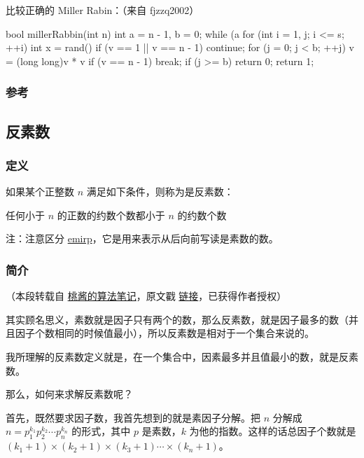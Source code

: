 比较正确的 Miller Rabin：（来自 fjzzq2002）

\begin{cppcode}
bool millerRabbin(int n) {
  int a = n - 1, b = 0;
  while (a %
  for (int i = 1, j; i <= s; ++i) {
    int x = rand() %
    if (v == 1 || v == n - 1) continue;
    for (j = 0; j < b; ++j) {
      v = (long long)v * v %
      if (v == n - 1) break;
    }
    if (j >= b) return 0;
  }
  return 1;
}
\end{cppcode}

\subsubsection{参考}

\href{http://www.matrix67.com/blog/archives/234}{}

\href{https://blog.bill.moe/miller-rabin-notes/}{}

\subsection{反素数}

\subsubsection{定义}

如果某个正整数 $n$ 满足如下条件，则称为是反素数：

  任何小于 $n$ 的正数的约数个数都小于 $n$ 的约数个数

注：注意区分 \href{https://en.wikipedia.org/wiki/Emirp}{emirp}，它是用来表示从后向前写读是素数的数。

\subsubsection{简介}

（本段转载自 \href{https://zhuanlan.zhihu.com/c_1005817911142838272}{桃酱的算法笔记}，原文戳 \href{https://zhuanlan.zhihu.com/p/41759808}{链接}，已获得作者授权）

其实顾名思义，素数就是因子只有两个的数，那么反素数，就是因子最多的数（并且因子个数相同的时候值最小），所以反素数是相对于一个集合来说的。

我所理解的反素数定义就是，在一个集合中，因素最多并且值最小的数，就是反素数。

那么，如何来求解反素数呢？

首先，既然要求因子数，我首先想到的就是素因子分解。把 $n$ 分解成 $n=p_{1}^{k_{1}}p_{2}^{k_{2}} \cdots p_{n}^{k_{n}}$ 的形式，其中 $p$ 是素数，$k$ 为他的指数。这样的话总因子个数就是 $(k_1+1) \times (k_2+1) \times (k_3+1) \cdots \times (k_n+1)$。

